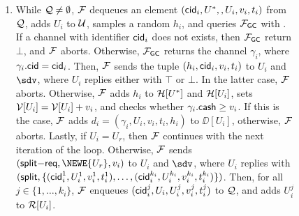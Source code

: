 \begin{figure*}[!t]
{{\begin{enumerate}
	
	\item While $\mathcal{Q} \neq \emptyset$, $\mathcal{F}$ dequeues an element $(\mathsf{cid}_i,U^*,,U_i,v_i,t_i)$ from 
	$\mathcal{Q}$, adds $U_i$ to $\mathcal{U}$, samples a random $h_i$, and queries $\mathcal{F}_{\mathsf{GC}}$ with 
	. If a channel with identifier $\mathsf{cid}_i$ does 
	not exists, then $\mathcal{F}_{\mathsf{GC}}$ return $\bot$, and $\mathcal{F}$ aborts. Otherwise, $\mathcal{F}_{\mathsf{GC}}$ returns 
	the channel $\gamma_i$, where $\gamma_i.\mathsf{cid} = \mathsf{cid}_i$. Then, $\mathcal{F}$ sends the tuple 
	$(h_i, \mathsf{cid}_i, v_i, t_i)$ to $U_i$ and $\sdv$, where $U_i$ replies either with $\top$ or 
	$\bot$. In the latter case, $\mathcal{F}$ aborts. Otherwise, $\mathcal{F}$ adds $h_i$ to $\mathcal{H}[U^*]$ and 
	$\mathcal{H}[U_i]$, sets $\mathcal{V}[U_i] = \mathcal{V}[U_i] + v_i$, and checks whether $\gamma_i.\mathsf{cash} \geq v_i$. 
	If this is the case, $\mathcal{F}$ adds $d_i = (\gamma_i,U_i,v_i,t_i,h_i)$ to $\DD[U_i]$, otherwise, 
	$\mathcal{F}$ aborts. Lastly, if $U_i = U_r$, then $\mathcal{F}$ continues with the next iteration of the 
	loop. Otherwise, $\mathcal{F}$ sends $(\mathsf{split}\mathsf{-req}, \NEWE{U_r}, v_i)$ to $U_i$ and 
	$\sdv$, where $U_i$ replies with $(\mathsf{split}, \{(\mathsf{cid}_i^1,U_i^1,v_i^1,t_i^1),\ldots,
	(\mathsf{cid}_i^{k_i},U_i^{k_i},v_i^{k_i},t_i^{k_i})\})$. Then, for all $j \in \{1,\ldots,k_i\}$, 
	$\mathcal{F}$ enqueues $(\mathsf{cid}_i^j,U_i,U_i^j,v_i^j,t_i^j)$ to $\mathcal{Q}$, and adds $U_i^j$ to $\mathcal{R}[U_i]$.
	

\end{enumerate}}}
\end{figure*}
